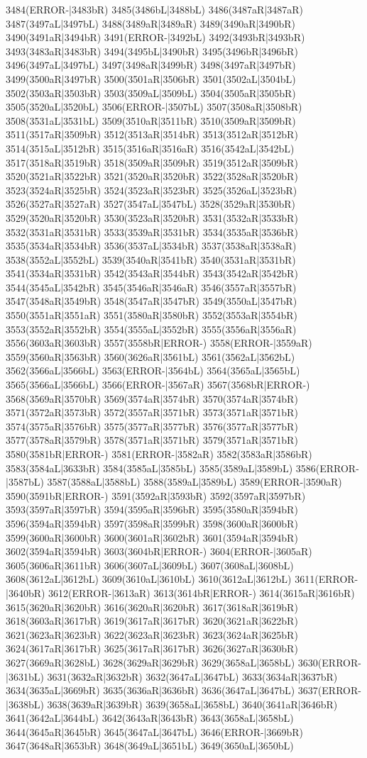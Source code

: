 3484(ERROR-|3483bR) 3485(3486bL|3488bL) 3486(3487aR|3487aR) 3487(3497aL|3497bL) 3488(3489aR|3489aR) 3489(3490aR|3490bR) 3490(3491aR|3494bR) 3491(ERROR-|3492bL) 3492(3493bR|3493bR) 3493(3483aR|3483bR) 3494(3495bL|3490bR) 3495(3496bR|3496bR) 3496(3497aL|3497bL) 3497(3498aR|3499bR) 3498(3497aR|3497bR) 3499(3500aR|3497bR) 3500(3501aR|3506bR) 3501(3502aL|3504bL) 3502(3503aR|3503bR) 3503(3509aL|3509bL) 3504(3505aR|3505bR) 3505(3520aL|3520bL) 3506(ERROR-|3507bL) 3507(3508aR|3508bR) 3508(3531aL|3531bL) 3509(3510aR|3511bR) 3510(3509aR|3509bR) 3511(3517aR|3509bR) 3512(3513aR|3514bR) 3513(3512aR|3512bR) 3514(3515aL|3512bR) 3515(3516aR|3516aR) 3516(3542aL|3542bL) 3517(3518aR|3519bR) 3518(3509aR|3509bR) 3519(3512aR|3509bR) 3520(3521aR|3522bR) 3521(3520aR|3520bR) 3522(3528aR|3520bR) 3523(3524aR|3525bR) 3524(3523aR|3523bR) 3525(3526aL|3523bR) 3526(3527aR|3527aR) 3527(3547aL|3547bL) 3528(3529aR|3530bR) 3529(3520aR|3520bR) 3530(3523aR|3520bR) 3531(3532aR|3533bR) 3532(3531aR|3531bR) 3533(3539aR|3531bR) 3534(3535aR|3536bR) 3535(3534aR|3534bR) 3536(3537aL|3534bR) 3537(3538aR|3538aR) 3538(3552aL|3552bL) 3539(3540aR|3541bR) 3540(3531aR|3531bR) 3541(3534aR|3531bR) 3542(3543aR|3544bR) 3543(3542aR|3542bR) 3544(3545aL|3542bR) 3545(3546aR|3546aR) 3546(3557aR|3557bR) 3547(3548aR|3549bR) 3548(3547aR|3547bR) 3549(3550aL|3547bR) 3550(3551aR|3551aR) 3551(3580aR|3580bR) 3552(3553aR|3554bR) 3553(3552aR|3552bR) 3554(3555aL|3552bR) 3555(3556aR|3556aR) 3556(3603aR|3603bR) 3557(3558bR|ERROR-) 3558(ERROR-|3559aR) 3559(3560aR|3563bR) 3560(3626aR|3561bL) 3561(3562aL|3562bL) 3562(3566aL|3566bL) 3563(ERROR-|3564bL) 3564(3565aL|3565bL) 3565(3566aL|3566bL) 3566(ERROR-|3567aR) 3567(3568bR|ERROR-) 3568(3569aR|3570bR) 3569(3574aR|3574bR) 3570(3574aR|3574bR) 3571(3572aR|3573bR) 3572(3557aR|3571bR) 3573(3571aR|3571bR) 3574(3575aR|3576bR) 3575(3577aR|3577bR) 3576(3577aR|3577bR) 3577(3578aR|3579bR) 3578(3571aR|3571bR) 3579(3571aR|3571bR) 3580(3581bR|ERROR-) 3581(ERROR-|3582aR) 3582(3583aR|3586bR) 3583(3584aL|3633bR) 3584(3585aL|3585bL) 3585(3589aL|3589bL) 3586(ERROR-|3587bL) 3587(3588aL|3588bL) 3588(3589aL|3589bL) 3589(ERROR-|3590aR) 3590(3591bR|ERROR-) 3591(3592aR|3593bR) 3592(3597aR|3597bR) 3593(3597aR|3597bR) 3594(3595aR|3596bR) 3595(3580aR|3594bR) 3596(3594aR|3594bR) 3597(3598aR|3599bR) 3598(3600aR|3600bR) 3599(3600aR|3600bR) 3600(3601aR|3602bR) 3601(3594aR|3594bR) 3602(3594aR|3594bR) 3603(3604bR|ERROR-) 3604(ERROR-|3605aR) 3605(3606aR|3611bR) 3606(3607aL|3609bL) 3607(3608aL|3608bL) 3608(3612aL|3612bL) 3609(3610aL|3610bL) 3610(3612aL|3612bL) 3611(ERROR-|3640bR) 3612(ERROR-|3613aR) 3613(3614bR|ERROR-) 3614(3615aR|3616bR) 3615(3620aR|3620bR) 3616(3620aR|3620bR) 3617(3618aR|3619bR) 3618(3603aR|3617bR) 3619(3617aR|3617bR) 3620(3621aR|3622bR) 3621(3623aR|3623bR) 3622(3623aR|3623bR) 3623(3624aR|3625bR) 3624(3617aR|3617bR) 3625(3617aR|3617bR) 3626(3627aR|3630bR) 3627(3669aR|3628bL) 3628(3629aR|3629bR) 3629(3658aL|3658bL) 3630(ERROR-|3631bL) 3631(3632aR|3632bR) 3632(3647aL|3647bL) 3633(3634aR|3637bR) 3634(3635aL|3669bR) 3635(3636aR|3636bR) 3636(3647aL|3647bL) 3637(ERROR-|3638bL) 3638(3639aR|3639bR) 3639(3658aL|3658bL) 3640(3641aR|3646bR) 3641(3642aL|3644bL) 3642(3643aR|3643bR) 3643(3658aL|3658bL) 3644(3645aR|3645bR) 3645(3647aL|3647bL) 3646(ERROR-|3669bR) 3647(3648aR|3653bR) 3648(3649aL|3651bL) 3649(3650aL|3650bL) 